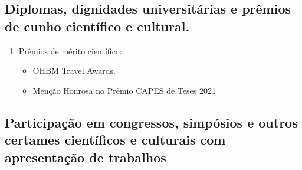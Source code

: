\documentclass[a4paper,oneside,10pt]{article}
\newcounter{document}%
\begin{document}
\subsection{Diplomas, dignidades universitárias e prêmios de cunho científico e cultural.}
\large{
\begin{enumerate}
        \item Prêmios de mérito científico:
        \begin{itemize}
                \item OHBM Travel Awards. \mbox{} \\
                \item Menção Honrosa no Prêmio CAPES de Teses 2021 \mbox{} \\
        \end{itemize}
\end{enumerate}}



\subsection{\large{Participação  em  congressos,  simpósios  e  outros  certames  científicos  e  culturais  com apresentação  de  trabalhos}}
\vspace{0.3cm}
\end{document}
